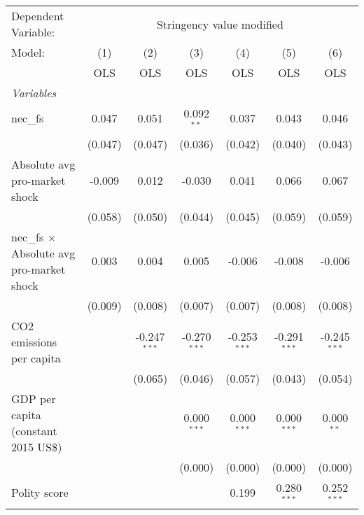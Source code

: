 
\begingroup
\centering
\begin{tabular}{lcccccc}
   \toprule
   Dependent Variable: & \multicolumn{6}{c}{Stringency value modified}\\
   Model:                                           & (1)     & (2)            & (3)            & (4)            & (5)            & (6)\\  
                                                    &  OLS    & OLS            & OLS            & OLS            & OLS            & OLS\\  
   \midrule
   \emph{Variables}\\
   nec\_fs                                          & 0.047   & 0.051          & 0.092$^{**}$   & 0.037          & 0.043          & 0.046\\   
                                                    & (0.047) & (0.047)        & (0.036)        & (0.042)        & (0.040)        & (0.043)\\   
   Absolute avg pro-market shock                    & -0.009  & 0.012          & -0.030         & 0.041          & 0.066          & 0.067\\   
                                                    & (0.058) & (0.050)        & (0.044)        & (0.045)        & (0.059)        & (0.059)\\   
   nec\_fs $\times$ Absolute avg pro-market shock   & 0.003   & 0.004          & 0.005          & -0.006         & -0.008         & -0.006\\   
                                                    & (0.009) & (0.008)        & (0.007)        & (0.007)        & (0.008)        & (0.008)\\   
   CO2 emissions per capita                         &         & -0.247$^{***}$ & -0.270$^{***}$ & -0.253$^{***}$ & -0.291$^{***}$ & -0.245$^{***}$\\   
                                                    &         & (0.065)        & (0.046)        & (0.057)        & (0.043)        & (0.054)\\   
   GDP per capita (constant 2015 US\$)              &         &                & 0.000$^{***}$  & 0.000$^{***}$  & 0.000$^{***}$  & 0.000$^{**}$\\   
                                                    &         &                & (0.000)        & (0.000)        & (0.000)        & (0.000)\\   
   Polity score                                     &         &                &                & 0.199          & 0.280$^{***}$  & 0.252$^{***}$\\   

\end{tabular}
